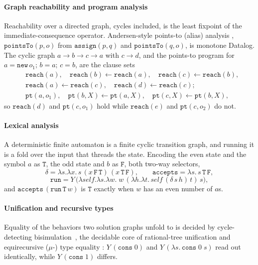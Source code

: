 \paragraph{Graph reachability and program analysis}
Reachability over a directed graph, cycles included, is the least fixpoint of the immediate-consequence operator. Andersen-style points-to (alias) analysis \cite{andersen1994-program-analysis-c, bravenboer2009-doop}, $\mathtt{pointsTo}(p,o)$ from $\mathtt{assign}(p,q)$ and $\mathtt{pointsTo}(q,o)$, is monotone Datalog. The cyclic graph $a\to b\to c\to a$ with $c\to d$, and the points-to program for $a=\mathtt{new}\,o_1;\,b=a;\,c=b$, are the clause sets
\[
  \begin{aligned}
    &\mathtt{reach}(a),\quad \mathtt{reach}(b)\leftarrow\mathtt{reach}(a),\quad
    \mathtt{reach}(c)\leftarrow\mathtt{reach}(b),\\
    &\mathtt{reach}(a)\leftarrow\mathtt{reach}(c),\quad \mathtt{reach}(d)\leftarrow\mathtt{reach}(c);\\
    &\mathtt{pt}(a,o_1),\quad \mathtt{pt}(b,X)\leftarrow\mathtt{pt}(a,X),\quad
    \mathtt{pt}(c,X)\leftarrow\mathtt{pt}(b,X),
  \end{aligned}
\]
so $\mathtt{reach}(d)$ and $\mathtt{pt}(c,o_1)$ hold while $\mathtt{reach}(e)$ and $\mathtt{pt}(c,o_2)$ do not.

\paragraph{Lexical analysis}
A deterministic finite automaton is a finite cyclic transition graph, and running it is a fold over the input that threads the state. Encoding the even state and the symbol $a$ as $\mathtt{T}$, the odd state and $b$ as $\mathtt{F}$, both two-way selectors,
\[
  \delta = \lambda s.\lambda x.\,s\,(x\,\mathtt{F}\,\mathtt{T})\,(x\,\mathtt{T}\,\mathtt{F}), \qquad
  \mathtt{accepts} = \lambda s.\,s\,\mathtt{T}\,\mathtt{F},
\]
\[
  \mathtt{run} = Y\,\big(\lambda\mathit{self}.\lambda s.\lambda w.\;
  w\,(\lambda h.\lambda t.\,\mathit{self}\,(\delta\,s\,h)\,t)\,s\big),
\]
and $\mathtt{accepts}\,(\mathtt{run}\,\mathtt{T}\,w)$ is $\mathtt{T}$ exactly when $w$ has an even number of $a$s.

\paragraph{Unification and recursive types}
Equality of the behaviors two solution graphs unfold to is decided by cycle-detecting bisimulation~\cite{courcelle1983-infinite-trees}, the decidable core of rational-tree unification \cite{colmerauer1984-trees} and equirecursive ($\mu$-) type equality \cite{amadio1993-subtyping-recursive-types, brandt1998-coinductive-type-equality}: $Y\,(\mathtt{cons}\;0)$ and $Y\,(\lambda s.\,\mathtt{cons}\;0\;s)$ read out identically, while $Y\,(\mathtt{cons}\;1)$ differs.

